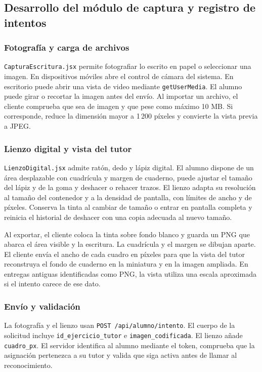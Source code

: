 \subsection{Desarrollo del módulo de captura y registro de intentos}

\subsubsection{Fotografía y carga de archivos}

\texttt{CapturaEscritura.jsx} permite fotografiar lo escrito en papel o seleccionar una imagen. En dispositivos móviles abre el control de cámara del sistema. En escritorio puede abrir una vista de video mediante \texttt{getUserMedia}. El alumno puede girar o recortar la imagen antes del envío. Al importar un archivo, el cliente comprueba que sea de imagen y que pese como máximo 10 MB. Si corresponde, reduce la dimensión mayor a 1\,200 píxeles y convierte la vista previa a JPEG.

\subsubsection{Lienzo digital y vista del tutor}

\texttt{LienzoDigital.jsx} admite ratón, dedo y lápiz digital. El alumno dispone de un área desplazable con cuadrícula y margen de cuaderno, puede ajustar el tamaño del lápiz y de la goma y deshacer o rehacer trazos. El lienzo adapta su resolución al tamaño del contenedor y a la densidad de pantalla, con límites de ancho y de píxeles. Conserva la tinta al cambiar de tamaño o entrar en pantalla completa y reinicia el historial de deshacer con una copia adecuada al nuevo tamaño.

Al exportar, el cliente coloca la tinta sobre fondo blanco y guarda un PNG que abarca el área visible y la escritura. La cuadrícula y el margen se dibujan aparte. El cliente envía el ancho de cada cuadro en píxeles para que la vista del tutor reconstruya el fondo de cuaderno en la miniatura y en la imagen ampliada. En entregas antiguas identificadas como PNG, la vista utiliza una escala aproximada si el intento carece de ese dato.

\subsubsection{Envío y validación}

La fotografía y el lienzo usan \texttt{POST /api/alumno/intento}. El cuerpo de la solicitud incluye \texttt{id\_ejercicio\_tutor} e \texttt{imagen\_codificada}. El lienzo añade \texttt{cuadro\_px}. El servidor identifica al alumno mediante el token, comprueba que la asignación pertenezca a su tutor y valida que siga activa antes de llamar al reconocimiento.

